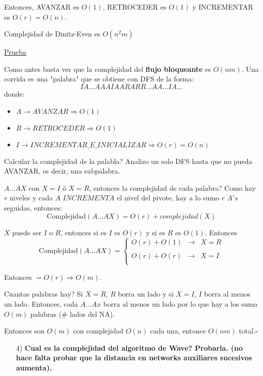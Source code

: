 \documentclass[12pt,a4paper]{article}
\begin{document}
Entonces, AVANZAR es $O(1)$, RETROCEDER es $O(1)$ y INCREMENTAR es $O(r)=O(n)$.

\begin{teorema} Complejidad de Dinitz-Even es $O(n^{2}m)$
\end{teorema}

\underline{Prueba}
\medskip

Como antes basta ver que la complejidad del \textbf{flujo bloqueante} es $O(nm)$. 
Una corrida es una "palabra" que se obtiene con DFS de la forma:
$$IA\ldots AAAIAARARR \ldots AA \ldots IA\ldots$$ 
donde:
\begin{itemize}
    \item $A \to AVANZAR \Rightarrow O(1)$
    \item $R \to RETROCEDER \Rightarrow O(1)$
    \item $I \to INCREMENTAR\_E\_INICIALIZAR \Rightarrow O(r) = O(n)$
\end{itemize}

Calcular la complejidad de la palabla? Analizo un solo DFS hasta que no pueda 
AVANZAR, es decir, una subpalabra.
\medskip

$A \ldots AX$ con $X=I$ ó $X=R$, entonces la complejidad de cada palabra? Como hay 
$r$ niveles y cada $A$ $INCREMENTA$ el nivel del pivote, hay a lo sumo $r$ $A's$
seguidas, entonces:
$$\text{Complejidad}(A \ldots AX) = O(r) + complejidad(X)$$

$X$ puede ser $I$ o $R$, entonces si es $I$ es $O(r)$ y si es $R$ es $O(1)$. Entonces 
$$\text{Complejidad}(A \ldots AX)= \left\{ \begin{array}{lcc}
    O(r) + O(1) & \to & X=R \\
    \\O(r) + O(r)& \to & X=I\\
    \end{array}
    \right.$$

Entonces $=O(r) \Rightarrow O(m)$. 
\medskip

Cuantas palabras hay? Si $X=R$, $R$ borra un lado y si $X=I$, $I$ borra al menos 
un lado. Entonces, cada $A \ldots Ax$ borra al menos un lado por lo que hay a los 
sumo $O(m)$ palabras ($\#$ lados del NA).
\medskip

Entonces son $O(m)$ con complejidad $O(n)$ cada una, entonce $O(nm)$ total.$\square$

\begin{itemize}
    \item [4)] \textbf{Cual es la complejidad del algoritmo de Wave? Probarla. (no hace falta 
    probar que la distancia en networks auxiliares sucesivos aumenta).}
    \label{dem:Wave}
\end{itemize}
\end{document}
